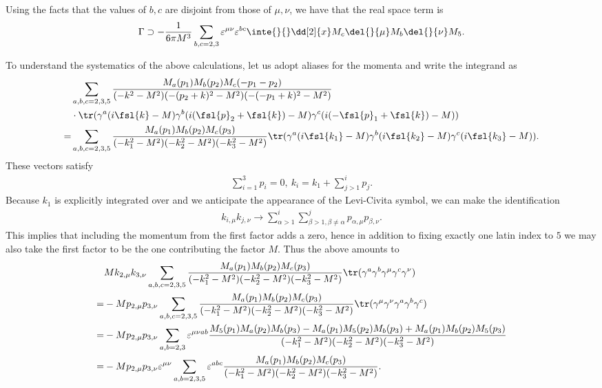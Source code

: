 Using the facts that the values of $b, c$ are disjoint from those of $\mu, \nu$, we have that the real space term is
\begin{align*}
	\Gamma \supset -\frac{1}{6\pi M^{3}}\sum\limits_{b, c = 2, 3}\varepsilon^{\mu\nu}\varepsilon^{bc}\inte{}{}\dd[2]{x}M_{c}\del{}{\mu}M_{b}\del{}{\nu}M_{5}.
\end{align*}

To understand the systematics of the above calculations, let us adopt aliases for the momenta and write the integrand as
\begin{align*}
	 &\sum\limits_{a, b, c = 2, 3, 5}\frac{M_{a}(p_{1})M_{b}(p_{2})M_{c}(-p_{1} - p_{2})}{(-k^{2} - M^{2})(-(p_{2} + k)^{2} - M^{2})(-(-p_{1} + k)^{2} - M^{2})} \\
	 &\cdot\tr(\gamma^{a}(i\fsl{k} - M)\gamma^{b}(i(\fsl{p}_{2} + \fsl{k}) - M)\gamma^{c}(i(-\fsl{p}_{1} + \fsl{k}) - M)) \\
	=& \sum\limits_{a, b, c = 2, 3, 5}\frac{M_{a}(p_{1})M_{b}(p_{2})M_{c}(p_{3})}{(-k_{1}^{2} - M^{2})(-k_{2}^{2} - M^{2})(-k_{3}^{2} - M^{2})}\tr(\gamma^{a}(i\fsl{k_{1}} - M)\gamma^{b}(i\fsl{k_{2}} - M)\gamma^{c}(i\fsl{k_{3}} - M)).
\end{align*}
These vectors satisfy
\begin{align*}
	\sum\limits_{i = 1}^{3}p_{i} = 0,\ k_{i} = k_{1} + \sum\limits_{j > 1}^{i}p_{j}.
\end{align*}
Because $k_{1}$ is explicitly integrated over and we anticipate the appearance of the Levi-Civita symbol, we can make the identification
\begin{align*}
	k_{i, \mu}k_{j, \nu} \to \sum\limits_{\alpha > 1}^{i}\sum\limits_{\beta > 1, \beta \neq \alpha}^{j}p_{\alpha, \mu}p_{\beta, \nu}.
\end{align*}
This implies that including the momentum from the first factor adds a zero, hence in addition to fixing exactly one latin index to $5$ we may also take the first factor to be the one contributing the factor $M$. Thus the above amounts to
\begin{align*}
	 &Mk_{2, \mu}k_{3, \nu}\sum\limits_{a, b, c = 2, 3, 5}\frac{M_{a}(p_{1})M_{b}(p_{2})M_{c}(p_{3})}{(-k_{1}^{2} - M^{2})(-k_{2}^{2} - M^{2})(-k_{3}^{2} - M^{2})}\tr(\gamma^{a}\gamma^{b}\gamma^{\mu}\gamma^{c}\gamma^{\nu}) \\
	=& -Mp_{2, \mu}p_{3, \nu}\sum\limits_{a, b, c = 2, 3, 5}\frac{M_{a}(p_{1})M_{b}(p_{2})M_{c}(p_{3})}{(-k_{1}^{2} - M^{2})(-k_{2}^{2} - M^{2})(-k_{3}^{2} - M^{2})}\tr(\gamma^{\mu}\gamma^{\nu}\gamma^{a}\gamma^{b}\gamma^{c}) \\
	=& -Mp_{2, \mu}p_{3, \nu}\sum\limits_{a, b = 2, 3}\varepsilon^{\mu\nu ab}\frac{M_{5}(p_{1})M_{a}(p_{2})M_{b}(p_{3}) - M_{a}(p_{1})M_{5}(p_{2})M_{b}(p_{3}) + M_{a}(p_{1})M_{b}(p_{2})M_{5}(p_{3})}{(-k_{1}^{2} - M^{2})(-k_{2}^{2} - M^{2})(-k_{3}^{2} - M^{2})} \\
	=& -Mp_{2, \mu}p_{3, \nu}\varepsilon^{\mu\nu}\sum\limits_{a, b = 2, 3, 5}\varepsilon^{abc}\frac{M_{a}(p_{1})M_{b}(p_{2})M_{c}(p_{3})}{(-k_{1}^{2} - M^{2})(-k_{2}^{2} - M^{2})(-k_{3}^{2} - M^{2})}.
\end{align*}
